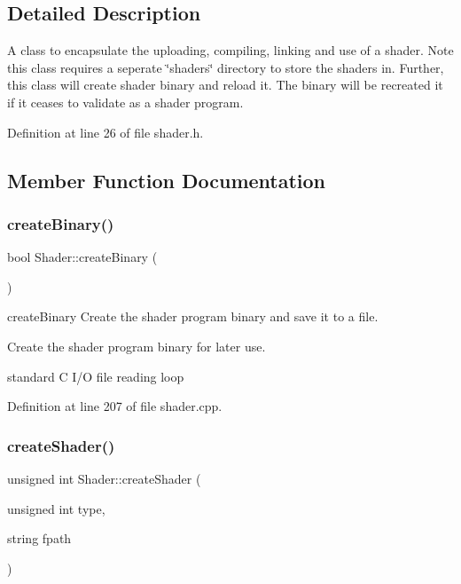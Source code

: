 \subsection{Detailed Description}
A class to encapsulate the uploading, compiling, linking and use of a shader. Note this class requires a seperate \char`\"{}shaders\char`\"{} directory to store the shaders in. Further, this class will create shader binary and reload it. The binary will be recreated it if it ceases to validate as a shader program. 

Definition at line 26 of file shader.\+h.



\subsection{Member Function Documentation}
\mbox{\label{classShader_a0793a05d73a73529c963c2d59b166440}} 
\subsubsection{\texorpdfstring{create\+Binary()}{createBinary()}}
{\footnotesize\ttfamily bool Shader\+::create\+Binary (\begin{DoxyParamCaption}{ }\end{DoxyParamCaption})}



create\+Binary Create the shader program binary and save it to a file. 

Create the shader program binary for later use.

standard C I/O file reading loop 

Definition at line 207 of file shader.\+cpp.

\mbox{\label{classShader_a5a9535209cf2d04bbeff96f8a945f227}} 
\subsubsection{\texorpdfstring{create\+Shader()}{createShader()}}
{\footnotesize\ttfamily unsigned int Shader\+::create\+Shader (\begin{DoxyParamCaption}\item[{unsigned int}]{type,  }\item[{string}]{fpath }\end{DoxyParamCaption})}



